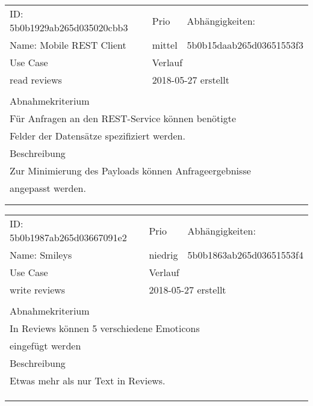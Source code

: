 \documentclass{article}
\begin{document}
\resizebox{10cm}{!} {
\begin{tabular}{lllll}
  \hline
  \multicolumn{2}{|l|}{\tiny{ID: 5b0b1929ab265d035020cbb3}} & Prio & \multicolumn{2}{|l|}{Abhängigkeiten:} \\
  \multicolumn{2}{|l|}{Name: Mobile REST Client} & mittel & \multicolumn{2}{|l|}{\tiny{5b0b15daab265d03651553f3}} \\
  \hline
  \multicolumn{2}{|l|}{Use Case} & \multicolumn{3}{|l|}{Verlauf} \\
  \multicolumn{2}{|l|}{read reviews} & \multicolumn{3}{|l|}{2018-05-27 erstellt} \\
  \multicolumn{2}{|l|}{} & \multicolumn{3}{|l|}{} \\
  \hline
  \multicolumn{5}{|l|}{Abnahmekriterium} \\
  \multicolumn{5}{|l|}{Für Anfragen an den REST-Service können benötigte} \\
  \multicolumn{5}{|l|}{Felder der Datensätze spezifiziert werden.} \\
  \hline
  \multicolumn{5}{|l|}{Beschreibung} \\
  \multicolumn{5}{|l|}{Zur Minimierung des Payloads können Anfrageergebnisse} \\
  \multicolumn{5}{|l|}{angepasst werden.} \\
  \multicolumn{5}{|l|}{} \\
  \multicolumn{5}{|l|}{} \\
  \hline
\end{tabular}
}
\resizebox{10cm}{!} {
\begin{tabular}{lllll}
  \hline
  \multicolumn{2}{|l|}{\tiny{ID: 5b0b1987ab265d03667091e2}} & Prio & \multicolumn{2}{|l|}{Abhängigkeiten:} \\
  \multicolumn{2}{|l|}{Name: Smileys} & niedrig & \multicolumn{2}{|l|}{\tiny{5b0b1863ab265d03651553f4}} \\
  \hline
  \multicolumn{2}{|l|}{Use Case} & \multicolumn{3}{|l|}{Verlauf} \\
  \multicolumn{2}{|l|}{write reviews} & \multicolumn{3}{|l|}{2018-05-27 erstellt} \\
  \multicolumn{2}{|l|}{} & \multicolumn{3}{|l|}{} \\
  \hline
  \multicolumn{5}{|l|}{Abnahmekriterium} \\
  \multicolumn{5}{|l|}{In Reviews können 5 verschiedene Emoticons} \\
  \multicolumn{5}{|l|}{eingefügt werden} \\
  \hline
  \multicolumn{5}{|l|}{Beschreibung} \\
  \multicolumn{5}{|l|}{Etwas mehr als nur Text in Reviews.} \\
  \multicolumn{5}{|l|}{} \\
  \multicolumn{5}{|l|}{} \\
  \multicolumn{5}{|l|}{} \\
  \hline
\end{tabular}
}
\end{document}
